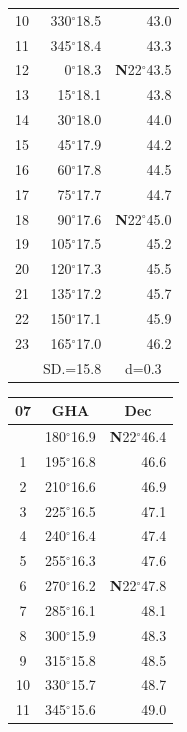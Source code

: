 \documentclass[10pt, a4paper]{report}
\begin{document}
\begin{scriptsize}
\begin{tabular*}{0.2\textwidth}[t]{@{\extracolsep{\fill}}|c|rr|}
10 & 330$^\circ$18.5 & 43.0\\
11 & 345$^\circ$18.4 & 43.3\\[2Pt]
12 & 0$^\circ$18.3 & \textbf{N}22$^\circ$43.5\\
13 & 15$^\circ$18.1 & 43.8\\
14 & 30$^\circ$18.0 & 44.0\\
15 & 45$^\circ$17.9 & \raisebox{0.24ex}{\boldmath$\cdot$~\boldmath$\cdot$~~}44.2\\
16 & 60$^\circ$17.8 & 44.5\\
17 & 75$^\circ$17.7 & 44.7\\[2Pt]
18 & 90$^\circ$17.6 & \textbf{N}22$^\circ$45.0\\
19 & 105$^\circ$17.5 & 45.2\\
20 & 120$^\circ$17.3 & 45.5\\
21 & 135$^\circ$17.2 & \raisebox{0.24ex}{\boldmath$\cdot$~\boldmath$\cdot$~~}45.7\\
22 & 150$^\circ$17.1 & 45.9\\
23 & 165$^\circ$17.0 & 46.2\\
\hline
\rule{0pt}{2.4ex} & \multicolumn{1}{c}{SD.=15.8} & \multicolumn{1}{c|}{d=0.3}\\
\hline
\end{tabular*}\noindent
\begin{tabular*}{0.2\textwidth}[t]{@{\extracolsep{\fill}}|c|rr|}
\hline
\multicolumn{1}{|c|}{\rule{0pt}{2.6ex}\textbf{07}} & \multicolumn{1}{c}{\textbf{GHA}} & \multicolumn{1}{c|}{\textbf{Dec}}\\
\hline\rule{0pt}{2.6ex}\noindent
0 & 180$^\circ$16.9 & \textbf{N}22$^\circ$46.4\\
1 & 195$^\circ$16.8 & 46.6\\
2 & 210$^\circ$16.6 & 46.9\\
3 & 225$^\circ$16.5 & \raisebox{0.24ex}{\boldmath$\cdot$~\boldmath$\cdot$~~}47.1\\
4 & 240$^\circ$16.4 & 47.4\\
5 & 255$^\circ$16.3 & 47.6\\[2Pt]
6 & 270$^\circ$16.2 & \textbf{N}22$^\circ$47.8\\
7 & 285$^\circ$16.1 & 48.1\\
8 & 300$^\circ$15.9 & 48.3\\
9 & 315$^\circ$15.8 & \raisebox{0.24ex}{\boldmath$\cdot$~\boldmath$\cdot$~~}48.5\\
10 & 330$^\circ$15.7 & 48.7\\
11 & 345$^\circ$15.6 & 49.0\\[2Pt]

\end{tabular*}
\end{scriptsize}
\end{document}
